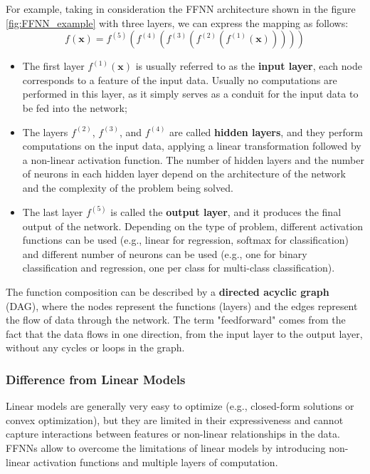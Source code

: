 For example, taking in consideration the FFNN architecture shown in the figure \ref{fig:FFNN_example} with three layers, we can express the mapping as follows:
\begin{equation*}
    f(\boldsymbol{x}) = f^{(5)}(f^{(4)}(f^{(3)}(f^{(2)}(f^{(1)}(\boldsymbol{x})))))
\end{equation*}
\begin{itemize}
    \item The first layer $f^{(1)}(\boldsymbol{x})$ is usually referred to as the \textbf{input layer}, each node corresponds to a feature of the input data. Usually no
    computations are performed in this layer, as it simply serves as a conduit for the input data to be fed into the network;
    \item The layers $f^{(2)}$, $f^{(3)}$, and $f^{(4)}$ are called \textbf{hidden layers}, and they perform computations on the input data, applying a linear transformation followed by a non-linear activation function.
    The number of hidden layers and the number of neurons in each hidden layer depend on the architecture of the network and the complexity of the problem being solved.
    \item The last layer $f^{(5)}$ is called the \textbf{output layer}, and it produces the final output of the network. Depending on the type of problem,
    different activation functions can be used (e.g., linear for regression, softmax for classification)
    and different number of neurons can be used (e.g., one for binary classification and regression, one per class for multi-class classification).
\end{itemize}
The function composition can be described by a \textbf{directed acyclic graph} (DAG), where the nodes represent the functions (layers) and the edges represent the flow of data through the network. 
The term "feedforward" comes from the fact that the data flows in one direction, from the input layer to the output layer, without any cycles or loops in the graph.

\subsubsection{Difference from Linear Models}
Linear models are generally very easy to optimize (e.g., closed-form solutions or convex optimization), but they are limited in their expressiveness and cannot capture interactions between features or non-linear relationships in the data.
FFNNs allow to overcome the limitations of linear models by introducing non-linear activation functions and multiple layers of computation.

